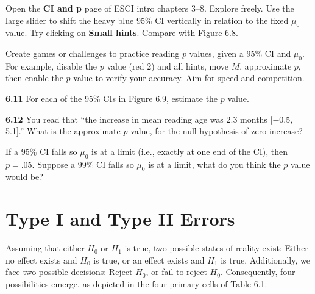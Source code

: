 \documentclass[
  letterpaper,
  DIV=11,
  numbers=noendperiod]{scrreprt}
\begin{document}
\begin{tcolorbox}[enhanced jigsaw, left=2mm, leftrule=.75mm, title={Exercise 6.9}, titlerule=0mm, toprule=.15mm, colframe=quarto-callout-note-color-frame, opacitybacktitle=0.6, bottomtitle=1mm, rightrule=.15mm, colbacktitle=quarto-callout-note-color!10!white, toptitle=1mm, arc=.35mm, colback=white, opacityback=0, bottomrule=.15mm, breakable, coltitle=black]

Open the \textbf{CI and p} page of ESCI intro chapters 3--8. Explore
freely. Use the large slider to shift the heavy blue 95\% CI vertically
in relation to the fixed \(\mu_0\) value. Try clicking on \textbf{Small
hints}. Compare with Figure 6.8.

\end{tcolorbox}

\begin{tcolorbox}[enhanced jigsaw, left=2mm, leftrule=.75mm, title={Exercise 6.10}, titlerule=0mm, toprule=.15mm, colframe=quarto-callout-note-color-frame, opacitybacktitle=0.6, bottomtitle=1mm, rightrule=.15mm, colbacktitle=quarto-callout-note-color!10!white, toptitle=1mm, arc=.35mm, colback=white, opacityback=0, bottomrule=.15mm, breakable, coltitle=black]

Create games or challenges to practice reading \(p\) values, given a
95\% CI and \(\mu_0\). For example, disable the \(p\) value (red 2) and
all hints, move \(M\), approximate \(p\), then enable the \(p\) value to
verify your accuracy. Aim for speed and competition.

\end{tcolorbox}

\textbf{6.11} For each of the 95\% CIs in Figure 6.9, estimate the \(p\)
value.

\textbf{6.12} You read that ``the increase in mean reading age was 2.3
months {[}−0.5, 5.1{]}.'' What is the approximate \(p\) value, for the
null hypothesis of zero increase?

If a 95\% CI falls so \(\mu_0\) is at a limit (i.e., exactly at one end
of the CI), then \(p = .05\). Suppose a 99\% CI falls so \(\mu_0\) is at
a limit, what do you think the \(p\) value would be?

\section{Type I and Type II Errors}\label{type-i-and-type-ii-errors}

Assuming that either \(H_0\) or \(H_1\) is true, two possible states of
reality exist: Either no effect exists and \(H_0\) is true, or an effect
exists and \(H_1\) is true. Additionally, we face two possible
decisions: Reject \(H_0\), or fail to reject \(H_0\). Consequently, four
possibilities emerge, as depicted in the four primary cells of Table
6.1.
\end{document}
